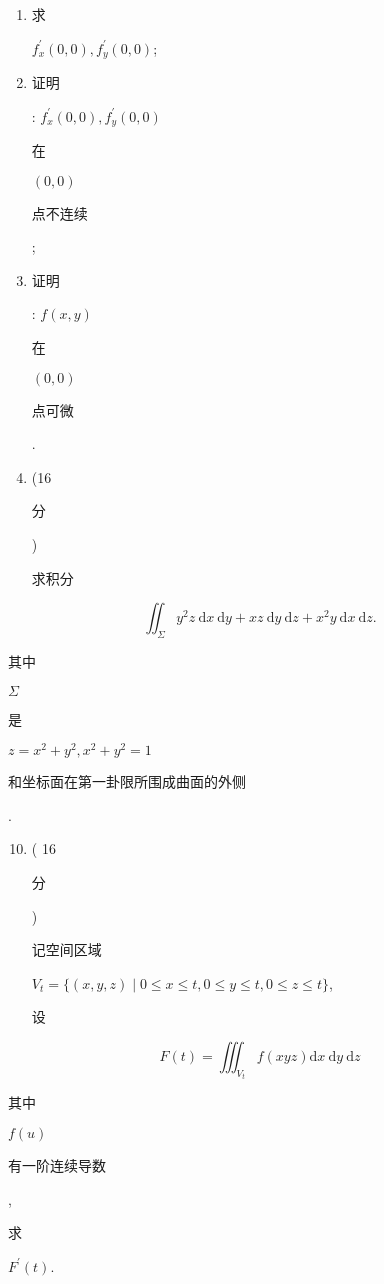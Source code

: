 \documentclass[10pt]{article}
\begin{document}
\begin{enumerate}
  \item \begin{CJK}{UTF8}{mj}求\end{CJK} $f_{x}^{\prime}(0,0), f_{y}^{\prime}(0,0)$;

  \item \begin{CJK}{UTF8}{mj}证明\end{CJK}: $f_{x}^{\prime}(0,0), f_{y}^{\prime}(0,0)$ \begin{CJK}{UTF8}{mj}在\end{CJK} $(0,0)$ \begin{CJK}{UTF8}{mj}点不连续\end{CJK};

  \item \begin{CJK}{UTF8}{mj}证明\end{CJK}: $f(x, y)$ \begin{CJK}{UTF8}{mj}在\end{CJK} $(0,0)$ \begin{CJK}{UTF8}{mj}点可微\end{CJK}.

  \item (16 \begin{CJK}{UTF8}{mj}分\end{CJK}) \begin{CJK}{UTF8}{mj}求积分\end{CJK}

\end{enumerate}
$$
\iint_{\Sigma} y^{2} z \mathrm{~d} x \mathrm{~d} y+x z \mathrm{~d} y \mathrm{~d} z+x^{2} y \mathrm{~d} x \mathrm{~d} z .
$$
\begin{CJK}{UTF8}{mj}其中\end{CJK} $\Sigma$ \begin{CJK}{UTF8}{mj}是\end{CJK} $z=x^{2}+y^{2}, x^{2}+y^{2}=1$ \begin{CJK}{UTF8}{mj}和坐标面在第一卦限所围成曲面的外侧\end{CJK}.

\begin{enumerate}
  \setcounter{enumi}{9}
  \item ( 16 \begin{CJK}{UTF8}{mj}分\end{CJK}) \begin{CJK}{UTF8}{mj}记空间区域\end{CJK} $V_{t}=\{(x, y, z) \mid 0 \leqslant x \leqslant t, 0 \leqslant y \leqslant t, 0 \leqslant z \leqslant t\}$, \begin{CJK}{UTF8}{mj}设\end{CJK}
\end{enumerate}
$$
F(t)=\iiint_{V_{t}} f(x y z) \mathrm{d} x \mathrm{~d} y \mathrm{~d} z
$$
\begin{CJK}{UTF8}{mj}其中\end{CJK} $f(u)$ \begin{CJK}{UTF8}{mj}有一阶连续导数\end{CJK}, \begin{CJK}{UTF8}{mj}求\end{CJK} $F^{\prime}(t)$.
\end{document}
